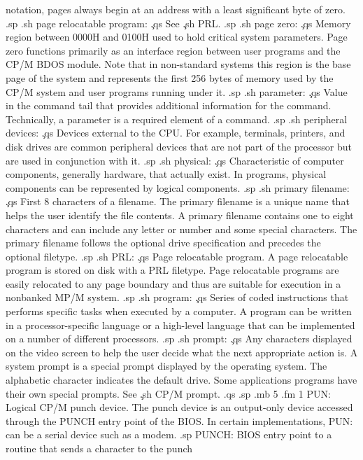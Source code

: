 notation, pages always begin at an address with a least 
significant byte of zero.
.sp
.sh
page relocatable program:  \c
.qs
See \c
.sh
PRL.
.sp
.sh
page zero:  \c
.qs
Memory region between 0000H and 0100H used to hold critical 
system parameters.  Page zero functions primarily as an interface 
region between user programs and the CP/M BDOS module.  Note that 
in non-standard systems this region is the base page of the 
system and represents the first 256 bytes of memory used by the 
CP/M system and user programs running under it.
.sp
.sh
parameter:  \c
.qs
Value in the command tail that provides additional information 
for the command.  Technically, a parameter is a required element 
of a command.
.sp
.sh
peripheral devices:  \c
.qs
Devices external to the CPU.  For example, terminals, printers, 
and disk drives are common peripheral devices that are not part 
of the processor but are used in conjunction with it.
.sp
.sh
physical:  \c
.qs
Characteristic of computer components, generally hardware, that 
actually exist.  In programs, physical components can be 
represented by logical components.
.sp
.sh
primary filename:  \c
.qs
First 8 characters of a filename.  The primary filename is a 
unique name that helps the user identify the file contents.  A 
primary filename contains one to eight characters and can include any 
letter or number and some special characters.  The primary 
filename follows the optional drive specification and precedes 
the optional filetype.
.sp
.sh
PRL:  \c
.qs
Page relocatable program.  A page relocatable program is stored 
on disk with a PRL filetype.  Page relocatable programs are 
easily relocated to any page boundary and thus are suitable for 
execution in a nonbanked MP/M system.
.sp
.sh
program:  \c
.qs
Series of coded instructions that performs specific tasks when 
executed by a computer.  A program can be written in a
processor-specific language or a high-level language that can be 
implemented on a number of different processors.
.sp
.sh
prompt:  \c
.qs
Any characters displayed on the video screen to help the user 
decide what the next appropriate action is.  A system prompt is a 
special prompt displayed by the operating
system.  The alphabetic character indicates the default drive.  Some 
applications programs have their own special prompts.  See \c
.sh
CP/M prompt.
.qs
.sp
.mb 5
.fm 1
PUN:
Logical CP/M punch device.  The punch device is an output-only 
device accessed through the PUNCH entry point of the BIOS.  In 
certain implementations, PUN: can be a serial device such as a 
modem.
.sp
PUNCH:
BIOS entry point to a routine that sends a character to the punch 
